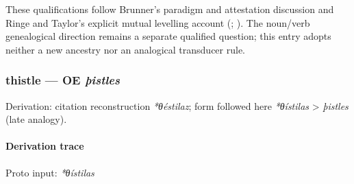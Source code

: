 \documentclass[
  british,
  a4paper,
]{article}
\begin{document}
These qualifications follow Brunner's paradigm and attestation
discussion and Ringe and Taylor's explicit mutual levelling account
(;
). The
noun/verb genealogical direction remains a separate qualified question;
this entry adopts neither a new ancestry nor an analogical transducer
rule.

\subsubsection{\texorpdfstring{thistle --- OE
\emph{þistles}}{thistle --- OE þistles}}\label{thistle-oe-uxfeistles}

Derivation: citation reconstruction \emph{*θéstilaz}; form followed here
\emph{*θístilas} \textgreater{} \emph{þistles} (late analogy).

\paragraph{Derivation trace}\label{derivation-trace-173}

Proto input: \emph{*θístilas}

\begingroup
\setlength{\fboxsep}{6pt}
\end{document}

